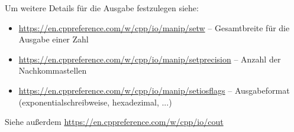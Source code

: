 \begin{plusbox}[]
Um weitere Details für die Ausgabe festzulegen siehe:
\begin{itemize}
\item \url{https://en.cppreference.com/w/cpp/io/manip/setw} -- Gesamtbreite für die Ausgabe einer Zahl
\item \url{https://en.cppreference.com/w/cpp/io/manip/setprecision} -- Anzahl der Nachkommastellen
\item \url{https://en.cppreference.com/w/cpp/io/manip/setiosflags} -- Ausgabeformat (exponentialschreibweise, hexadezimal, ...)
\end{itemize}
Siehe außerdem \url{https://en.cppreference.com/w/cpp/io/cout}
\end{plusbox}